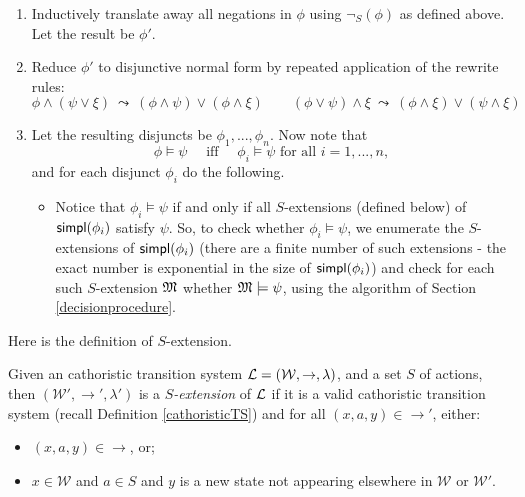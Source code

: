 \begin{enumerate}

\item Inductively translate away all negations in $\phi$ using
  $\neg_S(\phi)$ as defined above.  Let the result be $\phi'$.

\item Reduce $\phi'$ to disjunctive normal form by repeated
  application of the rewrite rules:
  \[
    \phi \land (\psi \lor \xi)  \ \leadsto \ (\phi \land \psi) \lor (\phi \land \xi)  
       \qquad
    (\phi \lor \psi) \land \xi  \ \leadsto \ (\phi \land \xi) \lor (\psi \land \xi) 
  \]

\item Let the resulting disjuncts be $\phi_1, ..., \phi_n$. 
Now note that
\[
\phi \models \psi \quad\text{ iff }\quad \phi_i \models \psi \text{ for all } i = 1, ..., n,
\]
and for each disjunct $\phi_i$ do the following.
\begin{itemize}

\item Notice that $\phi_i \models \psi$ if and only if all
  $S$-extensions (defined below) of $\mathsf{simpl}(\phi_i)$ satisfy $\psi$.
  So, to check whether $\phi_i \models \psi$, we enumerate the
  $S$-extensions of $\mathsf{simpl}(\phi_i)$ (there are a finite number of
  such extensions - the exact number is exponential in the size of
  $\mathsf{simpl}(\phi_i)$) and check for each such $S$-extension $\frak{M}$
  whether $\frak{M}\models \psi$, using the algorithm of Section
  \ref{decisionprocedure}.

\end{itemize}
\end{enumerate}

\NI  Here is the definition of $S$-extension.

\begin{definition}
Given an cathoristic transition system $\mathcal{L} =
(\mathcal{W},\rightarrow,\lambda)$, and a set $S$ of actions, then
$(\mathcal{W'},\rightarrow',\lambda')$ is a \emph{$S$-extension} of
$\mathcal{L}$ if it is a valid cathoristic transition system (recall
Definition \ref{cathoristicTS}) and for all $(x,a,y) \in
\rightarrow'$, either:
\begin{itemize} 

\item $(x, a, y) \in \rightarrow$,  or;

\item $x \in \mathcal{W}$ and $a \in S$ and $y$ is a new state not
  appearing elsewhere in $\mathcal{W}$ or $\mathcal{W'}$.

\end{itemize}
\end{definition}

